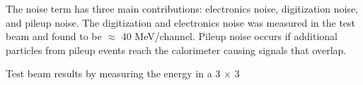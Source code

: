 The noise term has three main contributions: electronics noise, digitization 
noise, and pileup noise. 
The digitization and electronics noise was measured in the test beam and 
found to be $\approx$ 40 MeV/channel. 
Pileup noise occurs if additional particles from pileup events reach the 
calorimeter causing signals that overlap. 

Test beam results by measuring the energy in a 3 $\times$ 3 